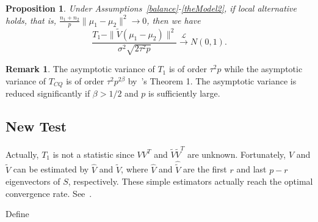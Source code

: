 \documentclass[review]{elsarticle}
\theoremstyle{plain}
\newtheorem{proposition}{\quad\quad Proposition}
\theoremstyle{definition}
\newtheorem{remark}{\quad\quad Remark}
\theoremstyle{remark}
\begin{document}
\begin{proposition}\label{oracleTheorem}
    Under Assumptions~\ref{balance}-\ref{theModel2}, if local alternative holds, that is, $\frac{n_1+n_2}{p}\|\mu_1-\mu_2\|^2\to 0$, then we have 
    \begin{equation*}
        \frac{T_1-\|\tilde{V}(\mu_1-\mu_2)\|^2}
        {\sigma^2\sqrt{2\tau^2 p}}\xrightarrow{\mathcal{L}}N(0,1).
    \end{equation*}
\end{proposition}

\begin{remark}
    The asymptotic variance of $T_1$ is of order $\tau^2 p$ while the asymptotic variance of $T_{CQ}$ is of order $\tau^2 p^{2\beta}$ by~\cite{Chen2010A}'s Theorem 1. The asymptotic variance is reduced significantly if $\beta>1/2$ and $p$ is sufficiently large.
\end{remark}




\subsection{New Test}

Actually, $T_1$ is not a statistic since $VV^T$ and $\tilde{V}\tilde{V}^T$ are unknown. Fortunately, $V$ and $\tilde{V}$ can be estimated by $\hat{V}$ and $\hat{\tilde{V}}$, where $\hat{V}$ and $\hat{\tilde{V}}$ are the first $r$ and last $p-r$ eigenvectors of $S$, respectively. These simple estimators actually reach the optimal convergence rate. See~\cite{Cai2012Sparse}.

Define
\end{document}
